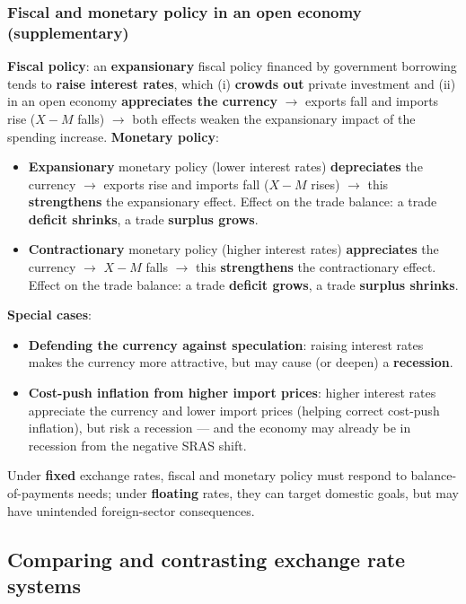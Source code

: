 \subsubsection*{Fiscal and monetary policy in an open economy (supplementary)}
\textbf{Fiscal policy}: an \textbf{expansionary} fiscal policy financed by government borrowing tends to \textbf{raise interest rates}, which (i) \textbf{crowds out} private investment and (ii) in an open economy \textbf{appreciates the currency} $\to$ exports fall and imports rise ($X - M$ falls) $\to$ both effects weaken the expansionary impact of the spending increase.
\textbf{Monetary policy}:
\begin{itemize}
  \item \textbf{Expansionary} monetary policy (lower interest rates) \textbf{depreciates} the currency $\to$ exports rise and imports fall ($X - M$ rises) $\to$ this \textbf{strengthens} the expansionary effect. Effect on the trade balance: a trade \textbf{deficit shrinks}, a trade \textbf{surplus grows}.
  \item \textbf{Contractionary} monetary policy (higher interest rates) \textbf{appreciates} the currency $\to$ $X - M$ falls $\to$ this \textbf{strengthens} the contractionary effect. Effect on the trade balance: a trade \textbf{deficit grows}, a trade \textbf{surplus shrinks}.
\end{itemize}
\textbf{Special cases}:
\begin{itemize}
  \item \textbf{Defending the currency against speculation}: raising interest rates makes the currency more attractive, but may cause (or deepen) a \textbf{recession}.
  \item \textbf{Cost-push inflation from higher import prices}: higher interest rates appreciate the currency and lower import prices (helping correct cost-push inflation), but risk a recession --- and the economy may already be in recession from the negative SRAS shift.
\end{itemize}
Under \textbf{fixed} exchange rates, fiscal and monetary policy must respond to balance-of-payments needs; under \textbf{floating} rates, they can target domestic goals, but may have unintended foreign-sector consequences.

\subsection{Comparing and contrasting exchange rate systems}

